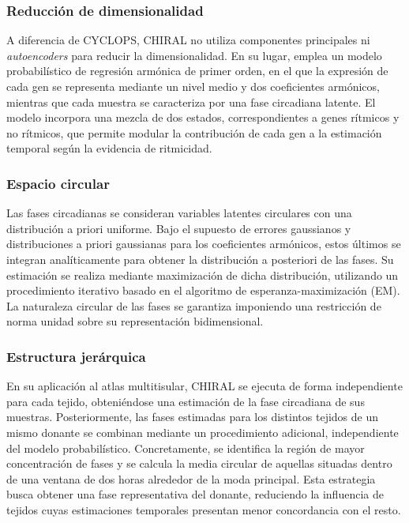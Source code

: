 \documentclass[12pt, a4paper]{report}
\begin{document}
\subsubsection*{Reducción de dimensionalidad}
A diferencia de CYCLOPS, CHIRAL no utiliza componentes principales ni \textit{autoencoders} para reducir la dimensionalidad. En su lugar, emplea un modelo probabilístico de regresión armónica de primer orden, en el que la expresión de cada gen se representa mediante un nivel medio y dos coeficientes armónicos, mientras que cada muestra se caracteriza por una fase circadiana latente. El modelo incorpora una mezcla de dos estados, correspondientes a genes rítmicos y no rítmicos, que permite modular la contribución de cada gen a la estimación temporal según la evidencia de ritmicidad.

\subsubsection*{Espacio circular}
Las fases circadianas se consideran variables latentes circulares con una distribución a priori uniforme. Bajo el supuesto de errores gaussianos y distribuciones a priori gaussianas para los coeficientes armónicos, estos últimos se integran analíticamente para obtener la distribución a posteriori de las fases. Su estimación se realiza mediante maximización de dicha distribución, utilizando un procedimiento iterativo basado en el algoritmo de esperanza-maximización (EM). La naturaleza circular de las fases se garantiza imponiendo una restricción de norma unidad sobre su representación bidimensional.

\subsubsection*{Estructura jerárquica}
En su aplicación al atlas multitisular, CHIRAL se ejecuta de forma independiente para cada tejido, obteniéndose una estimación de la fase circadiana de sus muestras. Posteriormente, las fases estimadas para los distintos tejidos de un mismo donante se combinan mediante un procedimiento adicional, independiente del modelo probabilístico. Concretamente, se identifica la región de mayor concentración de fases y se calcula la media circular de aquellas situadas dentro de una ventana de dos horas alrededor de la moda principal. Esta estrategia busca obtener una fase representativa del donante, reduciendo la influencia de tejidos cuyas estimaciones temporales presentan menor concordancia con el resto.
\end{document}
